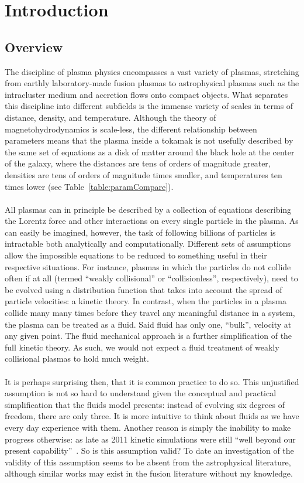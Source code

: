 \chapter{Introduction}\label{chap:introduction}
\section{Overview}
The discipline of plasma physics encompasses a vast variety of plasmas, stretching from earthly laboratory-made fusion plasmas to astrophysical plasmas such as the intracluster medium and accretion flows onto compact objects. What separates this discipline into different subfields is the immense variety of scales in terms of distance, density, and temperature. Although the theory of magnetohydrodynamics is scale-less, the different relationship between parameters means that the plasma inside a tokamak is not usefully described by the same set of equations as a disk of matter around the black hole at the center of the galaxy, where the distances are tens of orders of magnitude greater, densities are tens of orders of magnitude times smaller, and temperatures ten times lower (see Table~\ref{table:paramCompare}).\\
\\
All plasmas can in principle be described by a collection of equations describing the Lorentz force and other interactions on every single particle in the plasma. As can easily be imagined, however, the task of following billions of particles is intractable both analytically and computationally. Different sets of assumptions allow the impossible equations to be reduced to something useful in their respective situations. For instance, plasmas in which the particles do not collide often if at all (termed ``weakly collisional'' or ``collisionless'', respectively), need to be evolved using a distribution function that takes into account the spread of particle velocities: a kinetic theory. In contrast, when the particles in a plasma collide many many times before they travel any meaningful distance in a system, the plasma can be treated as a fluid. Said fluid has only one, ``bulk'', velocity at any given point. The fluid mechanical approach is a further simplification of the full kinetic theory. As such, we would not expect a fluid treatment of weakly collisional plasmas to hold much weight.\\
\\
It is perhaps surprising then, that it is common practice to do so. This unjustified assumption is not so hard to understand given the conceptual and practical simplification that the fluids model presents: instead of evolving six degrees of freedom, there are only three. It is more intuitive to think about fluids as we have every day experience with them. Another reason is simply the inability to make progress otherwise: as late as 2011 kinetic simulations were still ``well beyond our present capability''~\cite{Broderick2011}. So is this assumption valid? To date an investigation of the validity of this assumption seems to be absent from the astrophysical literature, although similar works may exist in the fusion literature without my knowledge.\\
